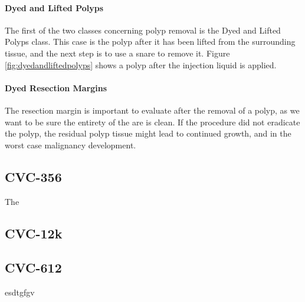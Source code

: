 \paragraph{Dyed and Lifted Polyps}
The first of the two classes concerning polyp removal is the Dyed and Lifted Polyps class. This case is the polyp after it has been lifted from the surrounding tissue, and the next step is to use a snare to remove it.
Figure \ref{fig:dyedandliftedpolyps} shows a polyp after the injection liquid is applied. 


\paragraph{Dyed Resection Margins}
The resection margin is important to evaluate after the removal of a polyp, as we want to be sure the entirety of the are is clean. 
If the procedure did not eradicate the polyp, the residual polyp tissue might lead to continued growth, and in the worst case malignancy development. 




\subsection{CVC-356}
The 

\subsection{CVC-12k}
\subsection{CVC-612}

esdtgfgv

 
    
\fi



